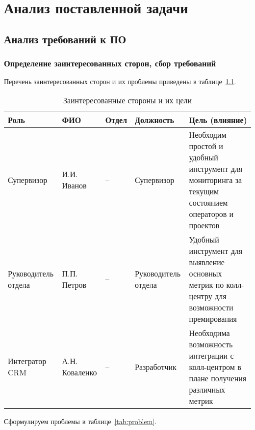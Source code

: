 \chapter{Анализ поставленной задачи}
\label{ch:analysis}

\section{Анализ требований к ПО}

\subsection{Определение заинтересованных сторон, сбор требований} %

Перечень заинтересованных сторон и их проблемы приведены в таблице~\ref{tab:itrppl}.

\begin{table}%
    \caption{Заинтересованные стороны и их цели}
    \begin{small}
    \begin{tabular}{|p{}|p{}|p{}|p{}   |p{}|}
        \hline
        Роль                          & ФИО            & Отдел          & Должность          & Цель (влияние) \\
        \hline
        Супервизор                    & И.И. Иванов    & --             & Супервизор         & Необходим простой и удобный инструмент для мониторинга за текущим состоянием операторов и проектов       \\
        \hline
        Руководитель отдела           & П.П. Петров    & --             & Руководитель отдела& Удобный инструмент для выявление основных метрик по колл-центру для возможности премирования         \\
        \hline
        Интегратор CRM                & А.Н. Коваленко & --             & Разработчик        & Необходима возможность интеграции с колл-центром в плане получения различных метрик         \\
        \hline
    \end{tabular}
    \end{small}
    \label{tab:itrppl}
\end{table}

Сформулируем проблемы в таблице~\ref{tab:problem}.

